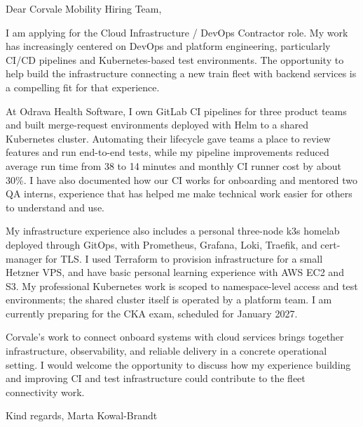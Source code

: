 \documentclass[11pt,a4paper]{article}
\begin{document}
Dear Corvale Mobility Hiring Team,

I am applying for the Cloud Infrastructure / DevOps Contractor role. My work has increasingly centered on DevOps and platform engineering, particularly CI/CD pipelines and Kubernetes-based test environments. The opportunity to help build the infrastructure connecting a new train fleet with backend services is a compelling fit for that experience.

At Odrava Health Software, I own GitLab CI pipelines for three product teams and built merge-request environments deployed with Helm to a shared Kubernetes cluster. Automating their lifecycle gave teams a place to review features and run end-to-end tests, while my pipeline improvements reduced average run time from 38 to 14 minutes and monthly CI runner cost by about 30\%. I have also documented how our CI works for onboarding and mentored two QA interns, experience that has helped me make technical work easier for others to understand and use.

My infrastructure experience also includes a personal three-node k3s homelab deployed through GitOps, with Prometheus, Grafana, Loki, Traefik, and cert-manager for TLS. I used Terraform to provision infrastructure for a small Hetzner VPS, and have basic personal learning experience with AWS EC2 and S3. My professional Kubernetes work is scoped to namespace-level access and test environments; the shared cluster itself is operated by a platform team. I am currently preparing for the CKA exam, scheduled for January 2027.

Corvale's work to connect onboard systems with cloud services brings together infrastructure, observability, and reliable delivery in a concrete operational setting. I would welcome the opportunity to discuss how my experience building and improving CI and test infrastructure could contribute to the fleet connectivity work.

Kind regards,
Marta Kowal-Brandt
\end{document}
